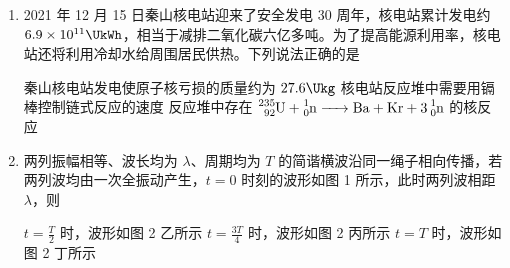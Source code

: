 \documentclass[\gkver]{gaokaozhenti}
\begin{document}
\begin{enumerate}
{	选项 C 正确；

	D．根据左手定则可知，圆管中各段所受的安培力方向指向圆管的轴线，则轻绳对圆管的拉力的合力始终等于圆管的重力，不随时间变化，选项 D 错误。

	故选 C。
}

\item
2021 年 12 月 15 日秦山核电站迎来了安全发电 30 周年，核电站累计发电约 $6.9\times10^{11}\UkWh$，相当于减排二氧化碳六亿多吨。为了提高能源利用率，核电站还将利用冷却水给周围居民供热。下列说法正确的是 


{秦山核电站发电使原子核亏损的质量约为 $27.6\Ukg$}
{核电站反应堆中需要用镉棒控制链式反应的速度}
{反应堆中存在 $\ce{^{235}_{92}U + ^{1}_{0}n -> Ba + Kr + 3^{1}_{0}n}$ 的核反应}


\item
两列振幅相等、波长均为 $\lambda$、周期均为 $T$ 的简谐横波沿同一绳子相向传播，若两列波均由一次全振动产生，$t=0$ 时刻的波形如图 1 所示，此时两列波相距 $\lambda$，则 


{$t=\frac{T}{2}$ 时，波形如图 2 乙所示}
{$t=\frac{3T}{4}$ 时，波形如图 2 丙所示}
{$t=T$ 时，波形如图 2 丁所示}


\end{enumerate}
\end{document}
